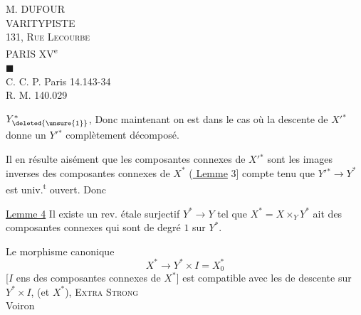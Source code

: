 M. DUFOUR\\
VARITYPISTE\\
131, \textsc{Rue Lecourbe}\\
PARIS XV\textsuperscript{e}\\
$\blacksquare$\\
C. C. P. Paris 14.143-34\\
R. M. 140.029

$Y^{*}_{\deleted{\unsure{1}}}$, Donc maintenant on est dans le cas où la descente de $X'{}^{*}$ donne un $Y'{}^{*}$ complètement décomposé.

Il en résulte aisément que les composantes connexes de $X'{}^{*}$ sont les images inverses des composantes connexes de $X^{*}$ (\uline{ Lemme} 3] compte tenu que  $Y'{}^{*}\to Y^{*}$ est univ.\textsuperscript{t} ouvert. Donc

\uline{Lemme 4} Il existe un rev. étale surjectif $Y^{*}\longrightarrow Y$ tel que $X^{*}=X\times_Y Y^{*}$ ait des composantes connexes qui sont de degré $1$ sur $Y^{*}$.

Le morphisme canonique
\[
X^{*}\longrightarrow Y^{*}\times I=X^{*}_0
\]
[$I$ ens des composantes connexes de $X^{*}$] est compatible   avec les  de descente sur $Y^{*}\times I$, (et $X^{*}$), \unsure{\textbackslash}
\textsc{Extra Strong}\\
 Voiron
